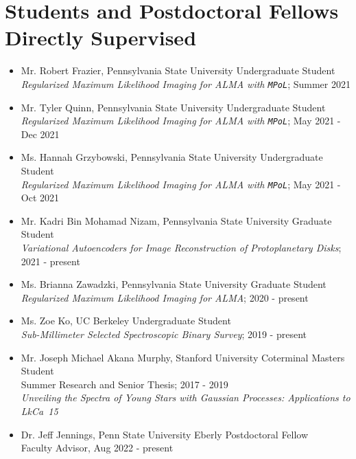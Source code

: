 \section*{Students and Postdoctoral Fellows Directly Supervised}
\begin{itemize}
  \item Mr. Robert Frazier, Pennsylvania State University Undergraduate Student \\ 
  \emph{Regularized Maximum Likelihood Imaging for ALMA with \texttt{MPoL}}; Summer 2021
  \item Mr. Tyler Quinn, Pennsylvania State University Undergraduate Student \\ 
  \emph{Regularized Maximum Likelihood Imaging for ALMA with \texttt{MPoL}}; May 2021 - Dec 2021
  \item Ms. Hannah Grzybowski, Pennsylvania State University Undergraduate Student \\ 
  \emph{Regularized Maximum Likelihood Imaging for ALMA with \texttt{MPoL}}; May 2021 - Oct 2021
  \item Mr. Kadri Bin Mohamad Nizam, Pennsylvania State University Graduate Student \\ 
  \emph{Variational Autoencoders for Image Reconstruction of Protoplanetary Disks}; 2021 - present
  \item Ms. Brianna Zawadzki, Pennsylvania State University Graduate Student \\
  \emph{Regularized Maximum Likelihood Imaging for ALMA}; 2020 - present
  \item Ms. Zoe Ko, UC Berkeley Undergraduate Student \\ 
  \emph{Sub-Millimeter Selected Spectroscopic Binary Survey}; 2019 - present 
  \item Mr. Joseph Michael Akana Murphy, Stanford University Coterminal Masters Student \\
  Summer Research and Senior Thesis; 2017 - 2019\\
  \emph{Unveiling the Spectra of Young Stars with Gaussian Processes: Applications to LkCa~15}
  \item Dr. Jeff Jennings, Penn State University Eberly Postdoctoral Fellow \\
  Faculty Advisor, Aug 2022 - present\\
\end{itemize}
